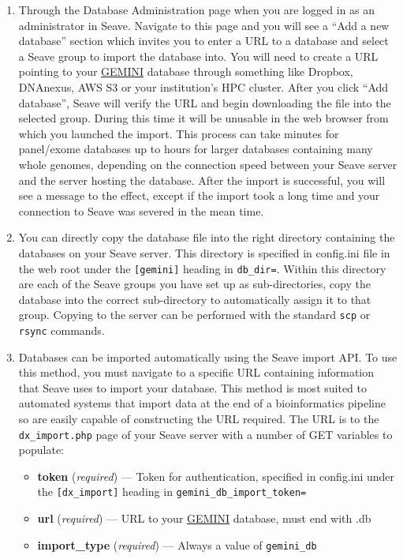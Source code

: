 \documentclass[11pt, a4paper]{article}
\newcommand{\GEMINI}{\href{https://gemini.readthedocs.io}{GEMINI} } %
\begin{document}
\begin{enumerate}
	\item Through the Database Administration page when you are logged in as an administrator in Seave. Navigate to this page and you will see a ``Add a new database'' section which invites you to enter a URL to a database and select a Seave group to import the database into. You will need to create a URL pointing to your \GEMINI database through something like Dropbox, DNAnexus, AWS S3 or your institution's HPC cluster. After you click ``Add database'', Seave will verify the URL and begin downloading the file into the selected group. During this time it will be unusable in the web browser from which you launched the import. This process can take minutes for panel/exome databases up to hours for larger databases containing many whole genomes, depending on the connection speed between your Seave server and the server hosting the database. After the import is successful, you will see a message to the effect, except if the import took a long time and your connection to Seave was severed in the mean time. 
	\item You can directly copy the database file into the right directory containing the databases on your Seave server. This directory is specified in config.ini file in the web root under the \texttt{[gemini]} heading in \texttt{db\_dir=}. Within this directory are each of the Seave groups you have set up as sub-directories, copy the database into the correct sub-directory to automatically assign it to that group. Copying to the server can be performed with the standard \texttt{scp} or \texttt{rsync} commands.
	\item Databases can be imported automatically using the Seave import API. To use this method, you must navigate to a specific URL containing information that Seave uses to import your database. This method is most suited to automated systems that import data at the end of a bioinformatics pipeline so are easily capable of constructing the URL required. The URL is to the \texttt{dx\_import.php} page of your Seave server with a number of GET variables to populate:
	\begin{itemize}
		\item \textbf{token} (\textit{required}) --- Token for authentication, specified in config.ini under the \texttt{[dx\_import]} heading in \texttt{gemini\_db\_import\_token=}
		\item \textbf{url} (\textit{required}) --- URL to your \GEMINI database, must end with .db
		\item \textbf{import\_type} (\textit{required}) --- Always a value of \texttt{gemini\_db}

\end{itemize}
\end{enumerate}
\end{document}
